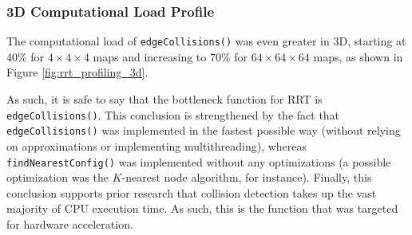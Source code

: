     \subsubsection{3D Computational Load Profile}
        The computational load of \texttt{edgeCollisions()} was even greater in 3D, starting at 40\% for $4\times 4\times 4$ maps and increasing to 70\% for $64\times 64\times 64$ maps, as shown in Figure \ref{fig:rrt_profiling_3d}.

        

        As such, it is safe to say that the bottleneck function for \gls{RRT} is \texttt{edgeCollisions()}. This conclusion is strengthened by the fact that \texttt{edgeCollisions()} was implemented in the fastest possible way (without relying on approximations or implementing multithreading), whereas \texttt{findNearestConfig()} was implemented without any optimizations (a possible optimization was the $K$-nearest node algorithm, for instance). Finally, this conclusion supports prior research that collision detection takes up the vast majority of CPU execution time. As such, this is the function that was targeted for hardware acceleration. 
